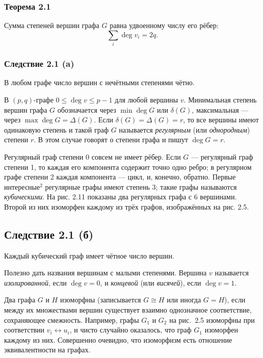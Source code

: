 \subsubsection*{Теорема 2.1}
Сумма степеней вершин графа \(G\) равна удвоенному числу его рёбер:
\[
\sum_i \deg v_i = 2q.
\]

\subsubsection*{Следствие 2.1 (a)}
В любом графе число вершин с нечётными степенями чётно.

В \((p, q)\)-графе \(0 \leq \deg v \leq p-1\) для любой вершины \(v\). Минимальная степень вершин графа \(G\) обозначается через \(\min \deg G\) или \(\delta(G)\), максимальная — через \(\max \deg G = \Delta(G)\). Если \(\delta(G) = \Delta(G) = r\), то все вершины имеют одинаковую степень и такой граф \(G\) называется \textit{регулярным} (или \textit{однородным}) степени \(r\). В этом случае говорят о степени графа и пишут \(\deg G = r\).

Регулярный граф степени 0 совсем не имеет рёбер. Если \(G\) — регулярный граф степени 1, то каждая его компонента содержит точно одно ребро; в регулярном графе степени 2 каждая компонента — цикл, и, конечно, обратно. Первые интересные\(^2\) регулярные графы имеют степень 3; такие графы называются \textit{кубическими}. На рис. 2.11 показаны два регулярных графа с 6 вершинами. Второй из них изоморфен каждому из трёх графов, изображённых на рис. 2.5.

\subsection*{Следствие 2.1 (б)}
Каждый кубический граф имеет чётное число вершин.

Полезно дать названия вершинам с малыми степенями. Вершина \(v\) называется \textit{изолированной}, если \(\deg v = 0\), и \textit{концевой} (или \textit{висячей}), если \(\deg v = 1\).

Два графа $G$ и $H$ изоморфны (записывается $G \cong H$ или иногда $G = H$), если между их множествами вершин существует взаимно однозначное соответствие, сохраняющее смежность. Например, графы $G_1$ и $G_2$ на рис.~2.5 изоморфны при соответствии $v_i \leftrightarrow u_i$, и чисто случайно оказалось, что граф $G_1$ изоморфен каждому из них. Совершенно очевидно, что изоморфизм есть отношение эквивалентности на графах.